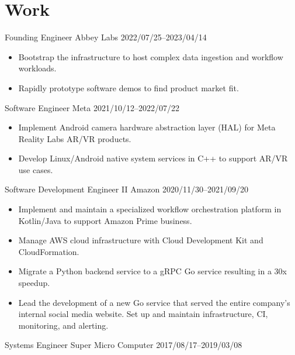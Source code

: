 \section{Work}

\begin{experiencelist}
   \experienceitem
        {Founding Engineer}
        {Abbey Labs}
        {2022/07/25--2023/04/14}
    \begin{itemize}[noitemsep, topsep=0pt]
        \item
            Bootstrap the infrastructure to host complex data ingestion and workflow workloads.
        \item
            Rapidly prototype software demos to find product market fit.
    \end{itemize}

    \experienceitem
        {Software Engineer}
        {Meta}
        {2021/10/12--2022/07/22}
    \begin{itemize}[noitemsep, topsep=0pt]
        \item
            Implement Android camera hardware abstraction layer (HAL) for
            Meta Reality Labs AR/VR products.
        \item
            Develop Linux/Android native system services in C++ to support
            AR/VR use cases.
    \end{itemize}

    \experienceitem
        {Software Development Engineer II}
        {Amazon}
        {2020/11/30--2021/09/20}
    \begin{itemize}[noitemsep, topsep=0pt]
        \item
            Implement and maintain a specialized workflow orchestration
            platform in Kotlin/Java to support Amazon Prime business.
        \item
            Manage AWS cloud infrastructure with Cloud Development Kit and
            CloudFormation.
    \end{itemize}

    \begin{itemize}[noitemsep, topsep=0pt]
        \item
            Migrate a Python backend service to a gRPC Go service resulting in
            a 30x speedup.
        \item
            Lead the development of a new Go service that served the entire
            company's internal social media website. Set up and maintain
            infrastructure, CI, monitoring, and alerting.
    \end{itemize}

    \experienceitem
        {Systems Engineer}
        {Super Micro Computer}
        {2017/08/17--2019/03/08}
\end{experiencelist}
